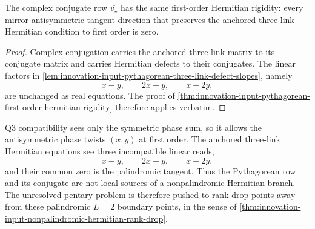 \begin{corollary}
\label{cor:innovation-input-conjugate-pythagorean-first-order-rigidity}
The complex conjugate row $\overline{v_\star}$ has the same first-order
Hermitian rigidity: every mirror-antisymmetric tangent direction that
preserves the anchored three-link Hermitian condition to first order is
zero.
\end{corollary}

\begin{proof}
Complex conjugation carries the anchored three-link matrix to its
conjugate matrix and carries Hermitian defects to their conjugates. The
linear factors in
\autoref{lem:innovation-input-pythagorean-three-link-defect-slopes},
namely
$$
x-y,
\qquad
2x-y,
\qquad
x-2y,
$$
are unchanged as real equations. The proof of
\autoref{thm:innovation-input-pythagorean-first-order-hermitian-rigidity}
therefore applies verbatim.
\end{proof}

\begin{principle}
\label{prin:innovation-input-pythagorean-local-boundary-role}
Q3 compatibility sees only the symmetric phase sum, so it allows the
antisymmetric phase twists $(x,y)$ at first order. The anchored three-link
Hermitian equations see three incompatible linear reads,
$$
x-y,
\qquad
2x-y,
\qquad
x-2y,
$$
and their common zero is the palindromic tangent. Thus the Pythagorean
row and its conjugate are not local sources of a nonpalindromic
Hermitian branch. The unresolved pentary problem is therefore pushed to
rank-drop points away from these palindromic $L=2$ boundary points, in
the sense of
\autoref{thm:innovation-input-nonpalindromic-hermitian-rank-drop}.
\end{principle}

